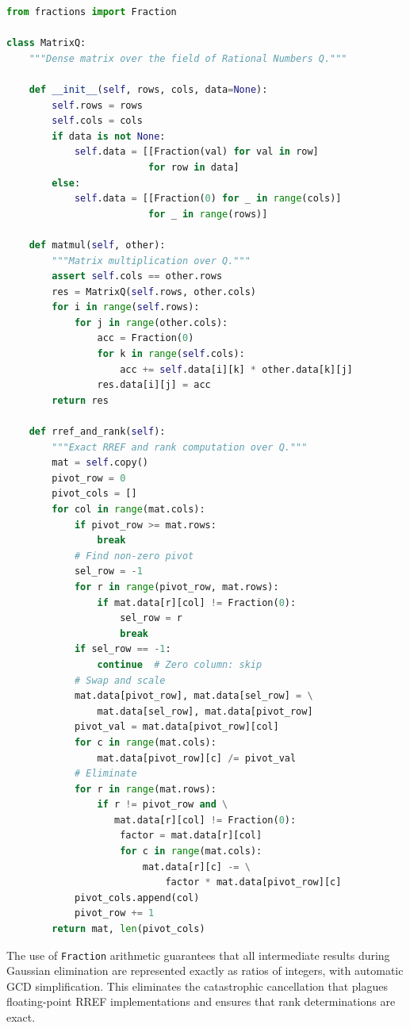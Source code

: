 \documentclass[manuscript, nonacm, review=false]{acmart}
\theoremstyle{definition}
\theoremstyle{plain}
\begin{document}
\begin{lstlisting}[language=Python, caption={MatrixQ class: Exact rational matrix algebra}, label={lst:matrixq}]
from fractions import Fraction

class MatrixQ:
    """Dense matrix over the field of Rational Numbers Q."""
    
    def __init__(self, rows, cols, data=None):
        self.rows = rows
        self.cols = cols
        if data is not None:
            self.data = [[Fraction(val) for val in row]
                         for row in data]
        else:
            self.data = [[Fraction(0) for _ in range(cols)]
                         for _ in range(rows)]
    
    def matmul(self, other):
        """Matrix multiplication over Q."""
        assert self.cols == other.rows
        res = MatrixQ(self.rows, other.cols)
        for i in range(self.rows):
            for j in range(other.cols):
                acc = Fraction(0)
                for k in range(self.cols):
                    acc += self.data[i][k] * other.data[k][j]
                res.data[i][j] = acc
        return res
    
    def rref_and_rank(self):
        """Exact RREF and rank computation over Q."""
        mat = self.copy()
        pivot_row = 0
        pivot_cols = []
        for col in range(mat.cols):
            if pivot_row >= mat.rows:
                break
            # Find non-zero pivot
            sel_row = -1
            for r in range(pivot_row, mat.rows):
                if mat.data[r][col] != Fraction(0):
                    sel_row = r
                    break
            if sel_row == -1:
                continue  # Zero column: skip
            # Swap and scale
            mat.data[pivot_row], mat.data[sel_row] = \
                mat.data[sel_row], mat.data[pivot_row]
            pivot_val = mat.data[pivot_row][col]
            for c in range(mat.cols):
                mat.data[pivot_row][c] /= pivot_val
            # Eliminate
            for r in range(mat.rows):
                if r != pivot_row and \
                   mat.data[r][col] != Fraction(0):
                    factor = mat.data[r][col]
                    for c in range(mat.cols):
                        mat.data[r][c] -= \
                            factor * mat.data[pivot_row][c]
            pivot_cols.append(col)
            pivot_row += 1
        return mat, len(pivot_cols)
\end{lstlisting}

The use of \texttt{Fraction} arithmetic guarantees that all intermediate results during Gaussian elimination are represented exactly as ratios of integers, with automatic GCD simplification. This eliminates the catastrophic cancellation that plagues floating-point RREF implementations and ensures that rank determinations are exact.
\end{document}
